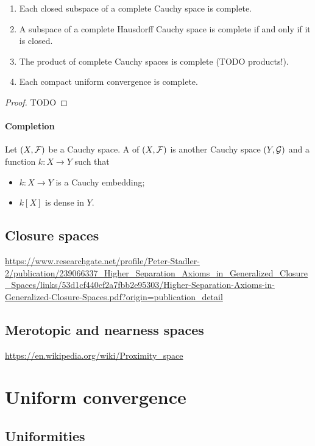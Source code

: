 \begin{proposition}
\begin{enumerate}
\item Each closed subspace of a complete Cauchy space is complete.
\item A subspace of a complete Hausdorff Cauchy space is complete \textup{if and only if} it is closed.
\item The product of complete Cauchy spaces is complete (TODO products!).
\item Each compact uniform convergence is complete.
\end{enumerate}
\end{proposition}
\begin{proof}
TODO
\end{proof}

\subsubsection{Completion}
\begin{definition}
Let $\left( X, \mathcal{F} \right)$ be a Cauchy space. A  of $\left( X, \mathcal{F} \right)$ is another Cauchy space $\left( Y, \mathcal{G} \right)$ and a function $k: X\to Y$ such that
\begin{itemize}
\item $k: X\to Y$ is a Cauchy embedding;
\item $k[X]$ is dense in $Y$.
\end{itemize}
\end{definition}

\section{Closure spaces}
\url{https://www.researchgate.net/profile/Peter-Stadler-2/publication/239066337_Higher_Separation_Axioms_in_Generalized_Closure_Spaces/links/53d1cf440cf2a7fbb2e95303/Higher-Separation-Axioms-in-Generalized-Closure-Spaces.pdf?origin=publication_detail}

\section{Merotopic and nearness spaces}
\url{https://en.wikipedia.org/wiki/Proximity_space}

\chapter{Uniform convergence}
\section{Uniformities}
